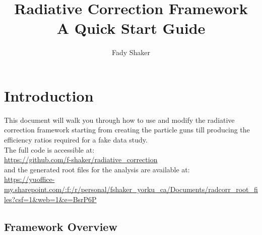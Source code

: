 \documentclass[12pt]{report}
\title{Radiative Correction Framework\\ A Quick Start Guide}
\author{Fady Shaker}
\begin{document}
\maketitle
\tableofcontents
\newpage
\section{Introduction}
This document will walk you through how to use and modify the radiative correction framework starting from creating the particle guns till producing the efficiency ratios required for a fake data study.\\

The full code is accessible at:\\
\url{https://github.com/f-shaker/radiative_correction}\\
and the generated root files for the analysis are available at:\\
\url{https://yuoffice-my.sharepoint.com/:f:/r/personal/fshaker_yorku_ca/Documents/radcorr_root_files?csf=1&web=1&e=BsrP6P}

\subsection{Framework Overview}
\begin{figure}[!ht]
\end{figure}
\end{document}
